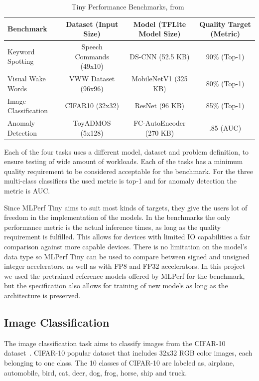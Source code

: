 \documentclass[12pt,a4paper,english
]{tunithesis}
\begin{document}
\begin{table}[ht]
\centering
\caption{Tiny Performance Benchmarks, from~\parencite{tinyperf}}
\begin{adjustbox}{max width=\textwidth}
\begin{tabular}{lccc}
  \toprule
  \textbf{Benchmark} & \textbf{Dataset (Input Size)} & \textbf{Model (TFLite Model Size)} & \textbf{Quality Target (Metric)} \\
  \midrule
  Keyword Spotting & Speech Commands (49x10) & DS-CNN (52.5 KB) & 90\% (Top-1) \\
  Visual Wake Words & VWW Dataset (96x96)  & MobileNetV1 (325 KB) & 80\% (Top-1) \\
  Image Classification & CIFAR10 (32x32) & ResNet (96 KB) & 85\% (Top-1) \\
  Anomaly Detection & ToyADMOS (5x128)  & FC-AutoEncoder (270 KB) & .85 (AUC) \\
  \bottomrule
\end{tabular}
\end{adjustbox}
\label{tab:tinyperf}
\end{table}
Each of the four tasks uses a different model, dataset and problem definition, to ensure testing of wide amount of workloads. Each of the tasks has a minimum quality requirement to be considered acceptable for the benchmark. For the three multi-class classifiers the used metric is top-1 and for anomaly detection the metric is AUC.

Since MLPerf Tiny aims to suit most kinds of targets, they give the users lot of freedom in the implementation of the models. In the benchmarks the only performance metric is the actual inference times, as long as the quality requirement is fulfilled. This allows for devices with limited IO capabilities a fair comparison against more capable devices. There is no limitation on the model's data type so MLPerf Tiny can be used to compare between signed and unsigned integer accelerators, as well as with FP8 and FP32 accelerators.
In this project we used the pretrained reference models offered by MLPerf for the benchmark, but the specification also allows for training of new models as long as the architecture is preserved.

\subsection{Image Classification}
\label{sec:tinyperf-ic}
The image classification task aims to classify images from the CIFAR-10 dataset~\cite{Cifar10Krizhevsky09learningmultiple}. CIFAR-10 popular dataset that includes 32x32 RGB color images, each belonging to one class. The 10 classes of CIFAR-10 are labeled as, airplane, automobile, bird, cat, deer, dog, frog, horse, ship and truck.
\end{document}

